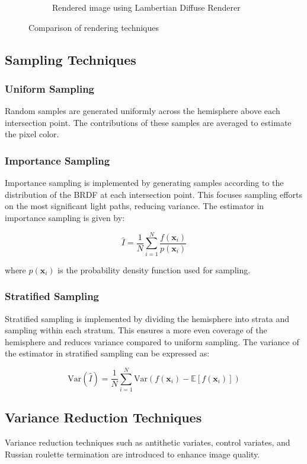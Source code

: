 \documentclass[12pt]{article}
\begin{document}
\begin{figure}[H]
\begin{subfigure}[b]{0.45\textwidth}
        \caption{Rendered image using Lambertian Diffuse Renderer}
        \label{fig:lambertian_diffuse}
    \end{subfigure}
    \caption{Comparison of rendering techniques}
    \label{fig:rendering_comparison}
\end{figure}

\subsection{Sampling Techniques}
\subsubsection{Uniform Sampling}
Random samples are generated uniformly across the hemisphere above each intersection point. The contributions of these samples are averaged to estimate the pixel color.

\subsubsection{Importance Sampling}
Importance sampling is implemented by generating samples according to the distribution of the BRDF at each intersection point. This focuses sampling efforts on the most significant light paths, reducing variance. The estimator in importance sampling is given by:

\begin{equation}
    \hat{I} = \frac{1}{N} \sum_{i=1}^{N} \frac{f(\mathbf{x}_i)}{p(\mathbf{x}_i)}
\end{equation}

where $p(\mathbf{x}_i)$ is the probability density function used for sampling.

\subsubsection{Stratified Sampling}
Stratified sampling is implemented by dividing the hemisphere into strata and sampling within each stratum. This ensures a more even coverage of the hemisphere and reduces variance compared to uniform sampling. The variance of the estimator in stratified sampling can be expressed as:

\begin{equation}
    \text{Var}(\hat{I}) = \frac{1}{N} \sum_{i=1}^{N} \text{Var}(f(\mathbf{x}_i) - \mathbb{E}[f(\mathbf{x}_i)])
\end{equation}

\subsection{Variance Reduction Techniques}
Variance reduction techniques such as antithetic variates, control variates, and Russian roulette termination are introduced to enhance image quality.
\end{document}
